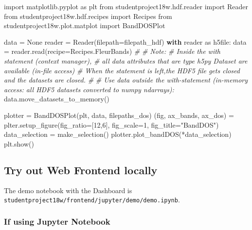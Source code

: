 \documentclass[]{article}
\newenvironment{Shaded}{}{}
\newcommand{\DecValTok}[1]{\textcolor[rgb]{0.25,0.63,0.44}{#1}}
\newcommand{\StringTok}[1]{\textcolor[rgb]{0.25,0.44,0.63}{#1}}
\newcommand{\ImportTok}[1]{#1}
\newcommand{\CommentTok}[1]{\textcolor[rgb]{0.38,0.63,0.69}{\textit{#1}}}
\newcommand{\VariableTok}[1]{\textcolor[rgb]{0.10,0.09,0.49}{#1}}
\newcommand{\ControlFlowTok}[1]{\textcolor[rgb]{0.00,0.44,0.13}{\textbf{#1}}}
\newcommand{\OperatorTok}[1]{\textcolor[rgb]{0.40,0.40,0.40}{#1}}
\newcommand{\NormalTok}[1]{#1}
\begin{document}
\begin{Shaded}
\begin{Highlighting}[]
\ImportTok{import}\NormalTok{ matplotlib.pyplot }\ImportTok{as}\NormalTok{ plt}
\ImportTok{from}\NormalTok{ studentproject18w.hdf.reader }\ImportTok{import}\NormalTok{ Reader}
\ImportTok{from}\NormalTok{ studentproject18w.hdf.recipes }\ImportTok{import}\NormalTok{ Recipes}
\ImportTok{from}\NormalTok{ studentproject18w.plot.matplot }\ImportTok{import}\NormalTok{ BandDOSPlot}

\NormalTok{data }\OperatorTok{=} \VariableTok{None}
\NormalTok{reader }\OperatorTok{=}\NormalTok{ Reader(filepath}\OperatorTok{=}\NormalTok{filepath_hdf)}
\ControlFlowTok{with}\NormalTok{ reader }\ImportTok{as}\NormalTok{ h5file:}
\NormalTok{    data }\OperatorTok{=}\NormalTok{ reader.read(recipe}\OperatorTok{=}\NormalTok{Recipes.FleurBands)}
    \CommentTok{#}
    \CommentTok{# Note:}
    \CommentTok{# Inside the with statement (context manager),}
    \CommentTok{# all data attributes that are type h5py Dataset are available (in-file access)}
    \CommentTok{# When the statement is left,the HDF5 file gets closed and the datasets are closed.}
    \CommentTok{#}
    \CommentTok{# Use data outside the with-statement (in-memory access: all HDF5 datasets converted to numpy ndarrays):}
\NormalTok{    data.move_datasets_to_memory()}

\NormalTok{plotter }\OperatorTok{=}\NormalTok{ BandDOSPlot(plt, data, filepaths_dos)}
\NormalTok{(fig, ax_bands, ax_dos) }\OperatorTok{=}\NormalTok{ plter.setup_figure(fig_ratio}\OperatorTok{=}\NormalTok{[}\DecValTok{12}\NormalTok{,}\DecValTok{6}\NormalTok{], fig_scale}\OperatorTok{=}\DecValTok{1}\NormalTok{, fig_title}\OperatorTok{=}\StringTok{"BandDOS"}\NormalTok{)}
\NormalTok{data_selection }\OperatorTok{=}\NormalTok{ make_selection()}
\NormalTok{plotter.plot_bandDOS(}\OperatorTok{*}\NormalTok{data_selection)}
\NormalTok{plt.show()}
\end{Highlighting}
\end{Shaded}

\subsection{Try out Web Frontend
locally}\label{try-out-web-frontend-locally}

The demo notebook with the Dashboard is
\texttt{studentproject18w/frontend/jupyter/demo/demo.ipynb}.

\subsubsection{If using Jupyter
Notebook}\label{if-using-jupyter-notebook}
\end{document}
